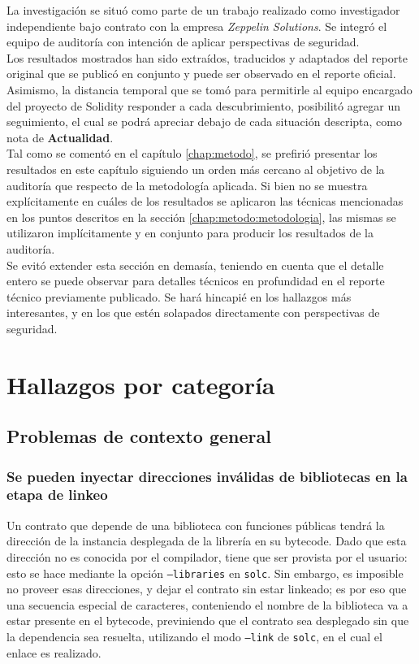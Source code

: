 La investigación se situó como parte de un trabajo realizado como investigador independiente bajo contrato con la empresa \textit{Zeppelin Solutions}. Se integró el equipo de auditoría con intención de aplicar perspectivas de seguridad.\\

Los resultados mostrados han sido extraídos, traducidos y adaptados del reporte original que se publicó en conjunto y puede ser observado en el reporte oficial\cite{SolidityCompilerAuditReportZep}. Asimismo, la distancia temporal que se tomó para permitirle al equipo encargado del proyecto de Solidity responder a cada descubrimiento, posibilitó agregar un seguimiento, el cual se podrá apreciar debajo de cada situación descripta, como nota de \textbf{Actualidad}.\\

Tal como se comentó en el capítulo \ref{chap:metodo}, se prefirió presentar los resultados en este capítulo siguiendo un orden más cercano al objetivo de la auditoría que respecto de la metodología aplicada. Si bien no se muestra explícitamente en cuáles de los resultados se aplicaron las técnicas mencionadas en los puntos descritos en la sección \ref{chap:metodo:metodologia}, las mismas se utilizaron implícitamente y en conjunto para producir los resultados de la auditoría.\\

Se evitó extender esta sección en demasía, teniendo en cuenta que el detalle entero se puede observar para detalles técnicos en profundidad en el reporte técnico previamente publicado. Se hará hincapié en los hallazgos más interesantes, y en los que estén solapados directamente con perspectivas de seguridad.


\section{Hallazgos por categoría}
\subsection{Problemas de contexto general}
\subsubsection{Se pueden inyectar direcciones inválidas de bibliotecas en la etapa de linkeo
}

Un contrato que depende de una biblioteca con funciones públicas tendrá la dirección de la instancia desplegada de la librería en su bytecode. Dado que esta dirección no es conocida por el compilador, tiene que ser provista por el usuario: esto se hace mediante la opción \texttt{--libraries} en \texttt{solc}. Sin embargo, es imposible no proveer esas direcciones, y dejar el contrato sin estar linkeado; es por eso que una secuencia especial de caracteres, conteniendo el nombre de la biblioteca va a estar presente en el bytecode, previniendo que el contrato sea desplegado sin que la dependencia sea resuelta, utilizando el modo \texttt{--link} de \texttt{solc}, en el cual el enlace es realizado.\\

